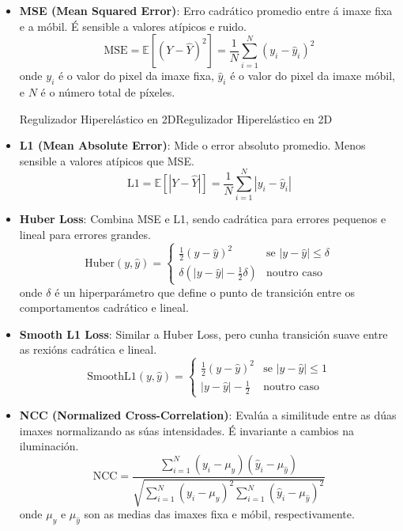 \begin{itemize}
    \item \textbf{MSE (Mean Squared Error)}:
    Erro cadrático promedio entre á imaxe fixa e a móbil. É sensible a valores atípicos e ruido.
    \[
    \text{MSE} = \mathbb{E}[(Y - \hat{Y})^2] = \frac{1}{N} \sum_{i=1}^{N} (y_i - \hat{y}_i)^2
    \]
    onde \( y_i \) é o valor do pixel da imaxe fixa, \( \hat{y}_i \) é o valor do pixel da imaxe móbil, e \( N \) é o número total de píxeles. \cite{Palubinskas02012017}

    Regulizador Hiperelástico en 2DRegulizador Hiperelástico en 2D    \item \textbf{L1 (Mean Absolute Error)}:
    Mide o error absoluto promedio. Menos sensible a valores atípicos que MSE.
    \[
    \text{L1} = \mathbb{E}[|Y - \hat{Y}|] = \frac{1}{N} \sum_{i=1}^{N} |y_i - \hat{y}_i|
    \]

    \item \textbf{Huber Loss}:
    Combina MSE e L1, sendo cadrática para errores pequenos e lineal para errores grandes.
    \[
    \text{Huber}(y, \hat{y}) = \begin{cases}
    \frac{1}{2}(y - \hat{y})^2 & \text{se } |y - \hat{y}| \leq \delta \\
    \delta(|y - \hat{y}| - \frac{1}{2}\delta) & \text{noutro caso}
    \end{cases}
    \]
    onde \( \delta \) é un hiperparámetro que define o punto de transición entre os comportamentos cadrático e lineal.

    \item \textbf{Smooth L1 Loss}:
    Similar a Huber Loss, pero cunha transición suave entre as rexións cadrática e lineal.
    \[
    \text{SmoothL1}(y, \hat{y}) = \begin{cases}
    \frac{1}{2}(y - \hat{y})^2 & \text{se } |y - \hat{y}| \leq 1 \\
    |y - \hat{y}| - \frac{1}{2} & \text{noutro caso}
    \end{cases}
    \]

    \item \textbf{NCC (Normalized Cross-Correlation)}:
    Evalúa a similitude entre as dúas imaxes normalizando as súas intensidades. É invariante a cambios na iluminación.
    \[
    \text{NCC} = \frac{\sum_{i=1}^{N} (y_i - \mu_y)(\hat{y}_i - \mu_{\hat{y}})}{\sqrt{\sum_{i=1}^{N} (y_i - \mu_y)^2 \sum_{i=1}^{N} (\hat{y}_i - \mu_{\hat{y}})^2}}
    \]
    onde \( \mu_y \) e \( \mu_{\hat{y}} \) son as medias das imaxes fixa e móbil, respectivamente.


\end{itemize}
